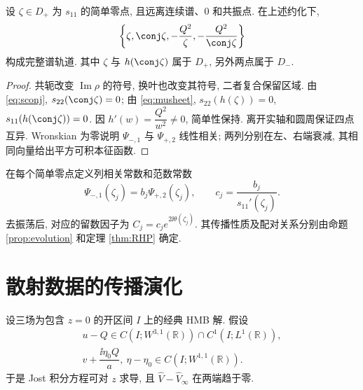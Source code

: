 \begin{proposition}[简单离散谱的轨道]\label{prop:quartet}
设 $\zeta\in D_+$ 为 $s_{11}$ 的简单零点, 且远离连续谱、$0$ 和共振点. 在上述约化下,
\begin{equation}\label{eq:quartet}
\left\{\zeta,\conj\zeta,-\dfrac{Q^2}{\zeta},
-\dfrac{Q^2}{\conj\zeta}\right\}
\end{equation}
构成完整谱轨道. 其中 $\zeta$ 与 $h(\conj\zeta)$ 属于 $D_+$, 另外两点属于 $D_-$.
\end{proposition}
\begin{proof}
共轭改变 $\operatorname{Im}\rho$ 的符号, 换叶也改变其符号, 二者复合保留区域. 由 \eqref{eq:sconj}, $s_{22}(\conj\zeta)=0$; 由 \eqref{eq:musheet}, $s_{22}(h(\zeta))=0$, $s_{11}(h(\conj\zeta))=0$. 因 $h'(w)=\dfrac{Q^2}{w^2}\ne0$, 简单性保持. 离开实轴和圆周保证四点互异. Wronskian 为零说明 $\Psi_{-,1}$ 与 $\Psi_{+,2}$ 线性相关; 两列分别在左、右端衰减, 其相同向量给出平方可积本征函数.
\end{proof}

在每个简单零点定义列相关常数和范数常数
\[
\Psi_{-,1}(\zeta_j)=b_j\Psi_{+,2}(\zeta_j),\qquad
c_j=\dfrac{b_j}{s_{11}'(\zeta_j)}.
\]
去振荡后, 对应的留数因子为 $C_j=c_j e^{2\ii\theta(\zeta_j)}$. 其传播性质及配对关系分别由命题 \ref{prop:evolution} 和定理 \ref{thm:RHP} 确定.

\section{散射数据的传播演化}
设三场为包含 $z=0$ 的开区间 $I$ 上的经典 HMB 解. 假设
\[
\begin{gathered}
u-Q\in C(I;W^{3,1}(\mathbb R))\cap C^1(I;L^1(\mathbb R)),\\
v+\dfrac{\ii\eta_0Q}{a},\ \eta-\eta_0\in C(I;W^{1,1}(\mathbb R)).
\end{gathered}
\]
于是 Jost 积分方程可对 $z$ 求导, 且 $\widehat V-\widehat V_\infty$ 在两端趋于零.

